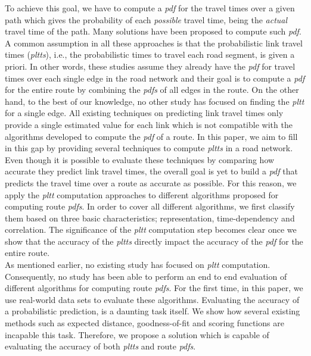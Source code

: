 To achieve this goal, we have to compute a \textit{pdf} for the travel times over a given path which gives the probability of each \textit{possible} travel time, being the \textit{actual} travel time of the path. Many solutions have been proposed to compute such \textit{pdf}. A common assumption in all these approaches is that the probabilistic link travel times (\textit{pltts}), i.e., the probabilistic times to travel each road segment, is given a priori. In other words, these studies assume they already have the \textit{pdf} for travel times over each single edge in the road network and their goal is to compute a \textit{pdf} for the entire route by combining the \textit{pdfs} of all edges in the route. On the other hand, to the best of our knowledge, no other study has focused on finding the \textit{pltt} for a single edge. All existing techniques on predicting link travel times only provide a single estimated value for each link which is not compatible with the algorithms developed to compute the \textit{pdf} of a route. In this paper, we aim to fill in this gap by providing several techniques to compute \textit{pltts} in a road network.\\
Even though it is possible to evaluate these techniques by comparing how accurate they predict link travel times, the overall goal is yet to build a \textit{pdf} that predicts the travel time over a route as accurate as possible. For this reason, we apply the \textit{pltt} computation approaches to different algorithms proposed for computing route \textit{pdfs}. In order to cover all different algorithms, we first classify them based on three basic characteristics; representation, time-dependency and correlation. The significance of the \textit{pltt} computation step becomes clear once we show that the accuracy of the \textit{pltts} directly impact the accuracy of the \textit{pdf} for the entire route.\\
As mentioned earlier, no existing study has focused on \textit{pltt} computation. Consequently, no study has been able to perform an end to end evaluation of different algorithms for computing route \textit{pdfs}. For the first time, in this paper, we use real-world data sets to evaluate these algorithms. Evaluating the accuracy of a probabilistic prediction, is a daunting task itself. We show how several existing methods such as expected distance, goodness-of-fit and scoring functions are incapable this task. Therefore, we propose a solution which is capable of evaluating the accuracy of both \textit{pltts} and route \textit{pdfs}.\\
